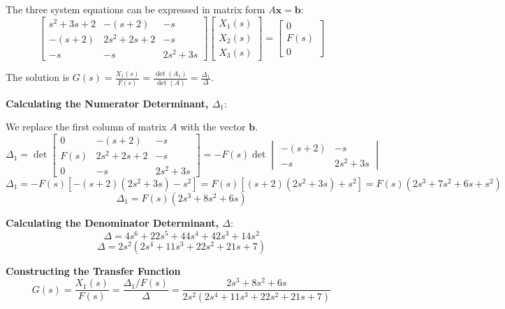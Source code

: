 \documentclass[11pt]{article}
\begin{document}
The three system equations can be expressed in matrix form $A\mathbf{x} = \mathbf{b}$:
$$
\begin{bmatrix}
s^2+3s+2 & -(s+2) & -s \\
-(s+2) & 2s^2+2s+2 & -s \\
-s & -s & 2s^2+3s
\end{bmatrix}
\begin{bmatrix}
X_1(s) \\
X_2(s) \\
X_3(s)
\end{bmatrix}
=
\begin{bmatrix}
0 \\
F(s) \\
0
\end{bmatrix}
$$

The solution is $G(s) = \frac{X_1(s)}{F(s)} = \frac{\det(A_1)}{\det(A)} = \frac{\Delta_1}{\Delta}$.

\vspace{12pt}
\noindent\textbf{Calculating the Numerator Determinant, $\Delta_1$}:
\vspace{12pt}

We replace the first column of matrix $A$ with the vector $\mathbf{b}$.
$$ \Delta_1 = \det
\begin{bmatrix}
0 & -(s+2) & -s \\
F(s) & 2s^2+2s+2 & -s \\
0 & -s & 2s^2+3s
\end{bmatrix}
= -F(s) \det \begin{vmatrix} -(s+2) & -s \\ -s & 2s^2+3s \end{vmatrix} $$
$$ \Delta_1 = -F(s) [-(s+2)(2s^2+3s) - s^2] = F(s)[(s+2)(2s^2+3s) + s^2] = F(s)(2s^3 + 7s^2 + 6s + s^2)$$
$$ \Delta_1 = F(s)(2s^3 + 8s^2 + 6s)$$

\vspace{12pt}
\noindent\textbf{Calculating the Denominator Determinant, $\Delta$}:
$$\Delta = 4s^6 + 22s^5 + 44s^4 + 42s^3 + 14s^2$$
$$\Delta = 2s^2(2s^4 + 11s^3 + 22s^2 + 21s + 7)$$

\vspace{12pt}
\noindent\textbf{Constructing the Transfer Function}
$$G(s) = \frac{X_1(s)}{F(s)} = \frac{\Delta_1 / F(s)}{\Delta} = \frac{2s^3 + 8s^2 + 6s}{2s^2(2s^4 + 11s^3 + 22s^2 + 21s + 7)}$$
\end{document}
